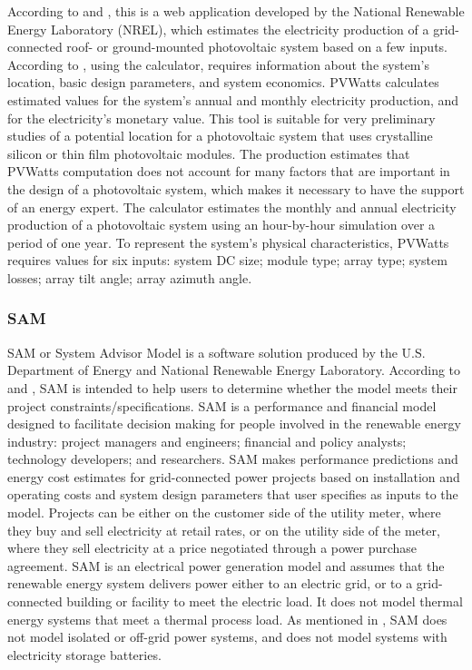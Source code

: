 According to \cite{Freeman} and \cite{NRELDobos}, this is a web application developed by the National Renewable Energy Laboratory (NREL), which estimates the electricity production of a grid-connected roof- or ground-mounted photovoltaic system based on a few inputs. According to \cite{NRELDobos}, using the calculator, requires information about the system's location, basic design parameters, and system economics. PVWatts calculates estimated values for the system's annual and monthly electricity production, and for the electricity's monetary value. This tool is suitable for very preliminary studies of a potential location for a photovoltaic system that uses crystalline silicon or thin film photovoltaic modules. The production estimates that PVWatts computation does not account for many factors that are important in the design of a photovoltaic system, which makes it necessary to have the support of an energy expert. The calculator estimates the monthly and annual electricity production of a photovoltaic system using an hour-by-hour simulation over a period of one year. To represent the system's physical characteristics, PVWatts requires values for six inputs: system DC size; module type; array type; system losses; array tilt angle; array azimuth angle.

\subsubsection{SAM}

SAM or System Advisor Model is a software solution produced by the U.S. Department of Energy and National Renewable Energy Laboratory. According to \cite{NRELBlair} and \cite{Cameron2008}, SAM is intended to help users to determine whether the model meets their project constraints/specifications. SAM is a performance and financial model designed to facilitate decision making for people involved in the renewable energy industry: project managers and engineers; financial and policy analysts; technology developers; and researchers. SAM makes performance predictions and energy cost estimates for grid-connected power projects based on installation and operating costs and system design parameters that user specifies as inputs to the model. Projects can be either on the customer side of the utility meter, where they buy and sell electricity at retail rates, or on the utility side of the meter, where they sell electricity at a price negotiated through a power purchase agreement. SAM is an electrical power generation model and assumes that the renewable energy system delivers power either to an electric grid, or to a grid-connected building or facility to meet the electric load. It does not model thermal energy systems that meet a thermal process load. As mentioned in \cite{NRELBlair}, SAM does not model isolated or off-grid power systems, and does not model systems with electricity storage batteries.

